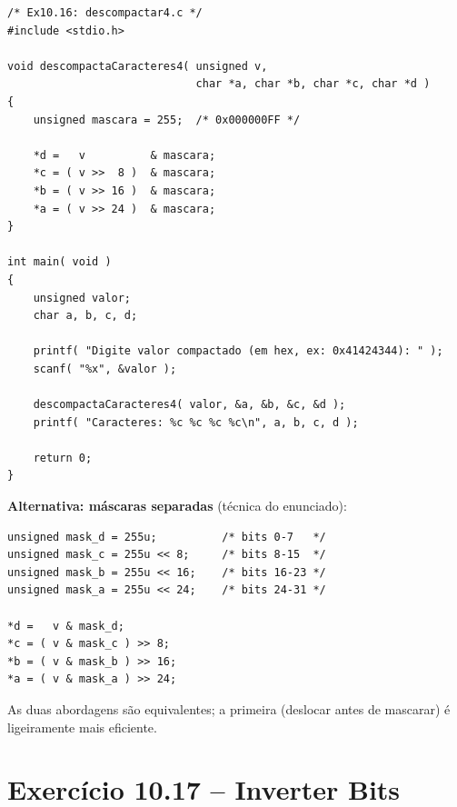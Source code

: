 \documentclass[12pt,a4paper]{article}
\begin{document}
\begin{respostabox}
\begin{lstlisting}
/* Ex10.16: descompactar4.c */
#include <stdio.h>

void descompactaCaracteres4( unsigned v,
                             char *a, char *b, char *c, char *d )
{
    unsigned mascara = 255;  /* 0x000000FF */

    *d =   v          & mascara;
    *c = ( v >>  8 )  & mascara;
    *b = ( v >> 16 )  & mascara;
    *a = ( v >> 24 )  & mascara;
}

int main( void )
{
    unsigned valor;
    char a, b, c, d;

    printf( "Digite valor compactado (em hex, ex: 0x41424344): " );
    scanf( "%x", &valor );

    descompactaCaracteres4( valor, &a, &b, &c, &d );
    printf( "Caracteres: %c %c %c %c\n", a, b, c, d );

    return 0;
}
\end{lstlisting}

\textbf{Alternativa: máscaras separadas} (técnica do enunciado):
\begin{lstlisting}
unsigned mask_d = 255u;          /* bits 0-7   */
unsigned mask_c = 255u << 8;     /* bits 8-15  */
unsigned mask_b = 255u << 16;    /* bits 16-23 */
unsigned mask_a = 255u << 24;    /* bits 24-31 */

*d =   v & mask_d;
*c = ( v & mask_c ) >> 8;
*b = ( v & mask_b ) >> 16;
*a = ( v & mask_a ) >> 24;
\end{lstlisting}

As duas abordagens são equivalentes; a primeira (deslocar antes de mascarar)
é ligeiramente mais eficiente.
\end{respostabox}

\section{Exercício 10.17 -- Inverter Bits}
\end{document}
